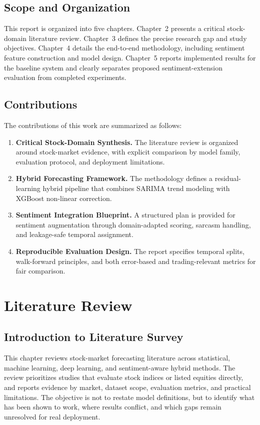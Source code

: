 \documentclass[12pt,a4paper]{article}
\begin{document}
\subsection{Scope and Organization}
This report is organized into five chapters. Chapter~2 presents a critical stock-domain literature review. Chapter~3 defines the precise research gap and study objectives. Chapter~4 details the end-to-end methodology, including sentiment feature construction and model design. Chapter~5 reports implemented results for the baseline system and clearly separates proposed sentiment-extension evaluation from completed experiments.

\subsection{Contributions}

The contributions of this work are summarized as follows:

\begin{enumerate}
    \item \textbf{Critical Stock-Domain Synthesis.} The literature review is organized around stock-market evidence, with explicit comparison by model family, evaluation protocol, and deployment limitations.
    \item \textbf{Hybrid Forecasting Framework.} The methodology defines a residual-learning hybrid pipeline that combines SARIMA trend modeling with XGBoost non-linear correction.
    \item \textbf{Sentiment Integration Blueprint.} A structured plan is provided for sentiment augmentation through domain-adapted scoring, sarcasm handling, and leakage-safe temporal assignment.
    \item \textbf{Reproducible Evaluation Design.} The report specifies temporal splits, walk-forward principles, and both error-based and trading-relevant metrics for fair comparison.
\end{enumerate}

\newpage

\section{Literature Review}

\subsection{Introduction to Literature Survey}
This chapter reviews stock-market forecasting literature across statistical, machine learning, deep learning, and sentiment-aware hybrid methods. The review prioritizes studies that evaluate stock indices or listed equities directly, and reports evidence by market, dataset scope, evaluation metrics, and practical limitations. The objective is not to restate model definitions, but to identify what has been shown to work, where results conflict, and which gaps remain unresolved for real deployment.
\end{document}
